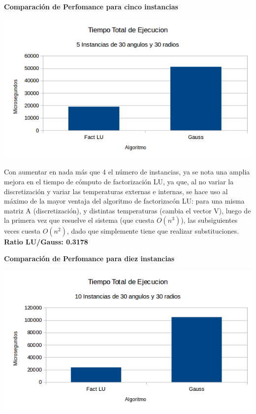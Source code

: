  \textbf{Comparaci\'on de Perfomance para cinco instancias}\\
\begin{center}
\includegraphics[scale=0.7]{experimentos2a_2b/2bCincoInstancias.png}
\end{center}

Con aumentar en nada m\'as que 4 el n\'umero de instancias, ya se nota una amplia mejora en el tiempo de c\'omputo de factorizaci\'on LU, ya que, al no variar la discretizaci\'on y variar las temperaturas externas e internas, se hace uso al m\'aximo de la mayor ventaja del algoritmo de factorizac\'on LU: para una misma matriz A (discretizaci\'on), y distintas temperaturas (cambia el vector V), luego de la primera vez que resuelve el sistema (que cuesta $O(n^3)$), las subsiguientes veces cuesta $O(n^2)$, dado que simplemente tiene que realizar substituciones. \textbf{Ratio LU/Gauss: 0.3178}

 \textbf{Comparaci\'on de Perfomance para diez instancias}\\
\begin{center}
\includegraphics[scale=0.7]{experimentos2a_2b/2bDiezInstancias.png}
\end{center}

